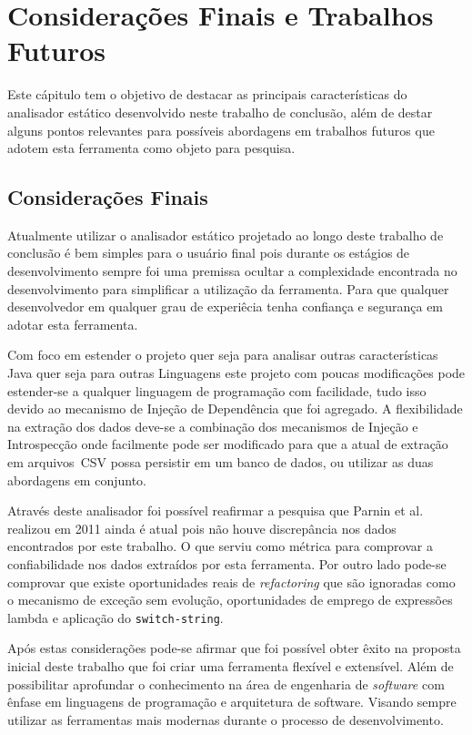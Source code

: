 \chapter{Considerações Finais e Trabalhos Futuros}
Este c\'{a}pitulo tem o objetivo de destacar as principais caracter\'{i}sticas do analisador est\'{a}tico desenvolvido neste trabalho de conclus\~{a}o, al\'{e}m de destar alguns pontos relevantes para poss\'{i}veis abordagens em trabalhos futuros que adotem esta ferramenta como objeto para pesquisa.

\section{Considerações Finais}
Atualmente utilizar o analisador est\'{a}tico projetado ao longo deste trabalho de conclus\~{a}o \'{e} bem simples para o usu\'{a}rio final pois durante os est\'{a}gios de desenvolvimento sempre foi uma premissa ocultar a complexidade encontrada no desenvolvimento para simplificar a utiliza\c{c}\~{a}o da ferramenta. Para que qualquer desenvolvedor em qualquer grau de experi\^{e}cia tenha confian\c{c}a e seguran\c{c}a em adotar esta ferramenta.

Com foco em estender o projeto quer seja para analisar outras caracter\'{i}sticas Java quer seja para outras Linguagens este projeto com poucas modifica\c{c}\~{o}es pode estender-se a qualquer linguagem de programa\c{c}\~{a}o com facilidade, tudo isso devido ao mecanismo de Injeção de Dependência  que foi agregado. A flexibilidade na extra\c{c}\~{a}o dos dados deve-se a combina\c{c}\~{a}o dos mecanismos de Inje\c{c}\~{a}o e Introspec\c{c}\~{a}o onde facilmente pode ser modificado para que a atual de extra\c{c}\~{a}o em arquivos~\acs{CSV} possa persistir em um banco de dados, ou utilizar as duas abordagens em conjunto.

Atrav\'{e}s deste analisador foi poss\'{i}vel reafirmar a pesquisa que Parnin et al.~\cite{Parnin:ACM2011} realizou em \num{2011} ainda \'{e} atual pois n\~{a}o houve discrep\^{a}ncia nos dados encontrados por este trabalho. O que serviu como m\'{e}trica para comprovar a confiabilidade nos dados extra\'{i}dos por esta ferramenta. Por outro lado pode-se comprovar que existe oportunidades reais de \textit{refactoring} que s\~{a}o ignoradas como o mecanismo de exce\c{c}\~{a}o sem evolu\c{c}\~{a}o, oportunidades de emprego de express\~{o}es lambda e aplica\c{c}\~{a}o do \texttt{switch-string}.

Ap\'{o}s estas considera\c{c}\~{o}es pode-se afirmar que foi poss\'{i}vel obter \^{e}xito na proposta inicial deste trabalho que foi criar uma ferramenta flex\'{i}vel e extens\'{i}vel. Al\'{e}m  de possibilitar aprofundar o conhecimento na \'{a}rea de engenharia de \textit{software} com \^{e}nfase em linguagens de programa\c{c}\~{a}o e arquitetura de software. Visando sempre utilizar as ferramentas mais modernas durante o processo de desenvolvimento.




